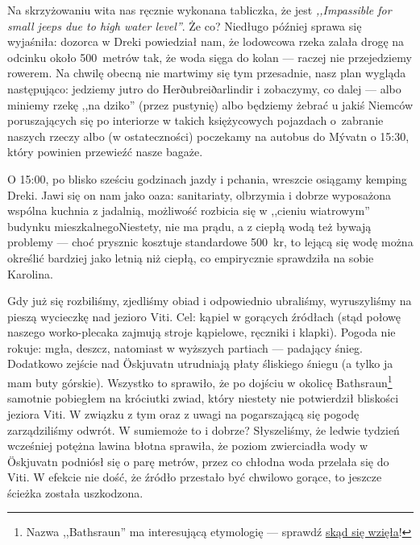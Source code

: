 \clearpage



\pagebreak

Na skrzyżowaniu wita nas ręcznie wykonana tabliczka, że  jest \emph{,,Impassible for small jeeps due to high water level''}. Że co? Niedługo później sprawa się wyjaśniła: dozorca w Dreki powiedział nam, że lodowcowa rzeka zalała drogę na odcinku około 500~metrów tak, że woda sięga do kolan --- raczej nie przejedziemy rowerem. Na chwilę obecną nie martwimy się tym przesadnie, nasz plan wygląda następująco: jedziemy jutro do Herðubreiðarlindir i zobaczymy, co dalej --- albo miniemy rzekę ,,na dziko'' (przez pustynię) albo będziemy żebrać u jakiś Niemców poruszających się po interiorze w takich księżycowych pojazdach o~zabranie naszych rzeczy albo (w ostateczności) poczekamy na autobus do Mývatn o 15:30, który powinien przewieźć nasze bagaże.


O 15:00, po blisko sześciu godzinach jazdy i pchania, wreszcie osiągamy kemping Dreki. Jawi się on nam jako oaza: sanitariaty, olbrzymia i dobrze wyposażona wspólna kuchnia z jadalnią, możliwość rozbicia się w ,,cieniu wiatrowym'' budynku mieszkalnego\textellipsis Niestety, nie ma prądu, a z ciepłą wodą też bywają problemy --- choć prysznic kosztuje standardowe 500~kr, to lejącą się wodę można określić bardziej jako letnią niż ciepłą, co empirycznie sprawdziła na sobie Karolina.


Gdy już się rozbiliśmy, zjedliśmy obiad i odpowiednio ubraliśmy, wyruszyliśmy na pieszą wycieczkę nad jezioro Viti. Cel: kąpiel w gorących źródłach (stąd połowę naszego worko-plecaka zajmują stroje kąpielowe, ręczniki i klapki). Pogoda nie rokuje: mgła, deszcz, natomiast w wyższych partiach --- padający śnieg. Dodatkowo zejście nad Öskjuvatn utrudniają płaty śliskiego śniegu (a tylko ja mam buty górskie). Wszystko to sprawiło, że po dojściu w okolicę Bathsraun\footnote{Nazwa ,,Bathsraun'' ma interesującą etymologię --- sprawdź \href{http://davemcgarvie.wordpress.com/2012/04/}{skąd się wzięła}!} samotnie pobiegłem na króciutki zwiad, który niestety nie potwierdził bliskości jeziora Viti. W związku z tym oraz z uwagi na pogarszającą się pogodę zarządziliśmy odwrót. W sumie\textellipsis może to i dobrze? Słyszeliśmy, że ledwie tydzień wcześniej potężna lawina błotna sprawiła, że poziom zwierciadła wody w Öskjuvatn podniósł się o parę metrów, przez co chłodna woda przelała się do Viti. W efekcie nie dość, że źródło przestało być chwilowo gorące, to jeszcze ścieżka została uszkodzona.

